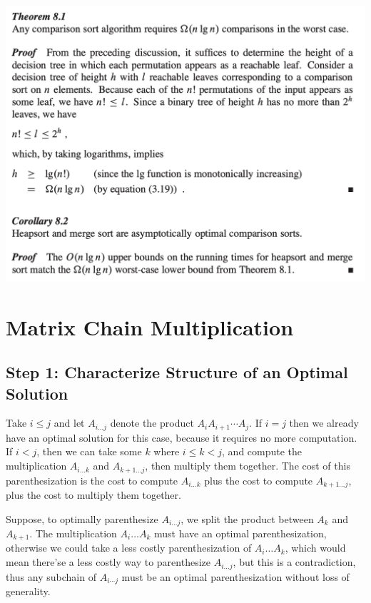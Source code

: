 \documentclass[11pt]{article}
\theoremstyle{definition}
\begin{document}
\includegraphics[scale=0.7]{images/theorem_8.1.png}
\newpage 

\section*{Matrix Chain Multiplication}
\subsection*{Step 1: Characterize Structure of an Optimal Solution}
Take \(i \leq j\) and let \(A_{i \dots j}\) denote the product \(A_i A_{i+1} \cdots A_j\).  If 
\(i = j\) then we already have an optimal solution for this case, because it requires no more 
computation.  If \(i<j\), then we can take some \(k\) where \(i \leq k < j\), and compute the 
multiplication \(A_{i \dots k}\) and \(A_{k+1 \dots j}\), then multiply them together.  The cost 
of this parenthesization is the cost to compute \(A_{i \dots k}\) plus the cost to compute 
\(A_{k+1 \dots j}\), plus the cost to multiply them together.

Suppose, to optimally parenthesize \(A_{i \dots j}\), we split the product between \(A_k\) and 
\(A_{k+1}\).  The multiplication \(A_i \dots A_k\) must have an optimal parenthesization, otherwise 
we could take a less costly parenthesization of \(A_i \dots A_k\), which would mean there'se a 
less costly way to parenthesize \(A_{i \dots j}\), but this is a contradiction, thus any subchain 
of \(A_{i \cdots j}\) must be an optimal parenthesization without loss of generality.
\end{document}

